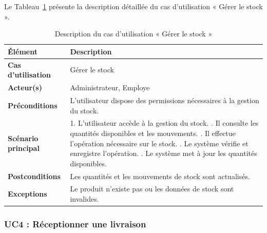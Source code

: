 Le Tableau~\ref{tab:uc3_sprint2} présente la description détaillée du cas d’utilisation « Gérer le stock ».
\begin{longtable}{|>{\raggedright\arraybackslash}p{4cm}|>{\raggedright\arraybackslash}p{10.5cm}|}

\caption{Description du cas d’utilisation « Gérer le stock »}
\label{tab:uc3_sprint2}\\

\hline
\textbf{Élément} & \textbf{Description} \\
\hline

\textbf{Cas d’utilisation} & Gérer le stock \\
\hline

\textbf{Acteur(s)} & Administrateur, Employe \\
\hline

\textbf{Préconditions} &
L’utilisateur dispose des permissions nécessaires à la gestion du stock. \\
\hline

\textbf{Scénario principal} &

1. L’utilisateur accède à la gestion du stock. \newline
2. Il consulte les quantités disponibles et les mouvements. \newline
3. Il effectue l’opération nécessaire sur le stock. \newline
4. Le système vérifie et enregistre l’opération. \newline
5. Le système met à jour les quantités disponibles. \\
   \hline

\textbf{Postconditions} &
Les quantités et les mouvements de stock sont actualisés. \\
\hline

\textbf{Exceptions} &
Le produit n’existe pas ou les données de stock sont invalides. \\
\hline

\end{longtable}
\vspace{0.3cm}

\subsubsection{UC4 : Réceptionner une livraison}

